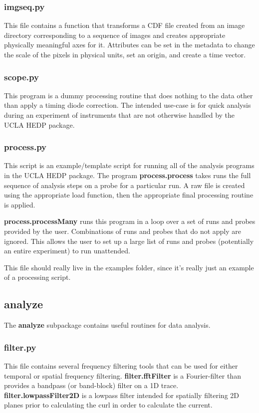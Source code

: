 \documentclass[12pt]{article}
\newcommand{\loc}[1]{{\bf \fontfamily{pcr}\selectfont #1}}
\newcommand{\todo}[1]{ \begin{tcolorbox} \centering  #1 \end{tcolorbox}}
\begin{document}
\subsubsection{\loc{imgseq.py}}

This file contains a function that transforms a CDF file created from an image directory corresponding to a sequence of images and creates appropriate physically meaningful axes for it. Attributes can be set in the metadata to change the scale of the pixels in physical units, set an origin, and create a time vector. 

\subsubsection{\loc{scope.py}}
This program is a dummy processing routine that does nothing to the data other than apply a timing diode correction. The intended use-case is for quick analysis during an experiment of instruments that are not otherwise handled by the UCLA HEDP package.

\subsubsection{\loc{process.py}}
This script is an example/template script for running all of the analysis programs in the UCLA HEDP package. The program \loc{process.process} takes runs the full sequence of analysis steps on a probe for a particular run. A raw file is created using the appropriate load function, then the appropriate final processing routine is applied.

\loc{process.processMany} runs this program in a loop over a set of runs and probes provided by the user. Combinations of runs and probes that do not apply are ignored. This allows the user to set up a large list of runs and probes (potentially an entire experiment) to run unattended.

\todo{This file should really live in the examples folder, since it's really just an example of a processing script.}





\subsection{\loc{analyze}}

The \loc{analyze} subpackage contains useful routines for data analysis. 

\subsubsection{\loc{filter.py}}
This file contains several frequency filtering tools that can be used for either temporal or spatial frequency filtering. \loc{filter.fftFilter} is a Fourier-filter than provides a bandpass (or band-block) filter on a 1D trace. \loc{filter.lowpassFilter2D} is a lowpass filter intended for spatially filtering 2D planes prior to calculating the curl in order to calculate the current.
\end{document}
